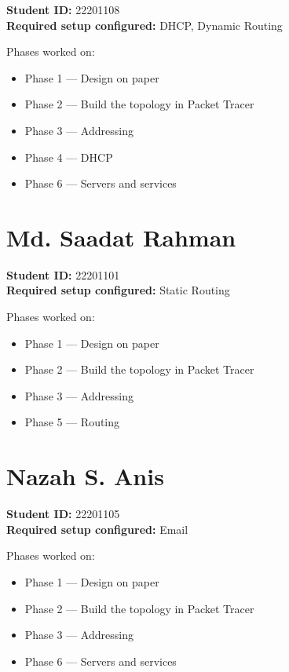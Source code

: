 \documentclass[11pt,a4paper]{article}
\newcommand{\idA}{22201108}
\newcommand{\memB}{Md. Saadat Rahman}
\newcommand{\idB}{22201101}
\newcommand{\memC}{Nazah S. Anis}
\newcommand{\idC}{22201105}
\begin{document}
\noindent
\textbf{Student ID:} \idA \\
\textbf{Required setup configured:} DHCP, Dynamic Routing

\vspace{2mm}
\noindent
Phases worked on:

\begin{itemize}[leftmargin=*]
\item Phase 1 --- Design on paper
\item Phase 2 --- Build the topology in Packet Tracer
\item Phase 3 --- Addressing
\item Phase 4 --- DHCP
\item Phase 6 --- Servers and services
\end{itemize}

\section{\memB}

\noindent
\textbf{Student ID:} \idB \\
\textbf{Required setup configured:} Static Routing

\vspace{2mm}
\noindent
Phases worked on:

\begin{itemize}[leftmargin=*]
\item Phase 1 --- Design on paper
\item Phase 2 --- Build the topology in Packet Tracer
\item Phase 3 --- Addressing
\item Phase 5 --- Routing
\end{itemize}

\section{\memC}

\noindent
\textbf{Student ID:} \idC \\
\textbf{Required setup configured:} Email

\vspace{2mm}
\noindent
Phases worked on:

\begin{itemize}[leftmargin=*]
\item Phase 1 --- Design on paper
\item Phase 2 --- Build the topology in Packet Tracer
\item Phase 3 --- Addressing
\item Phase 6 --- Servers and services
\end{itemize}
\end{document}
